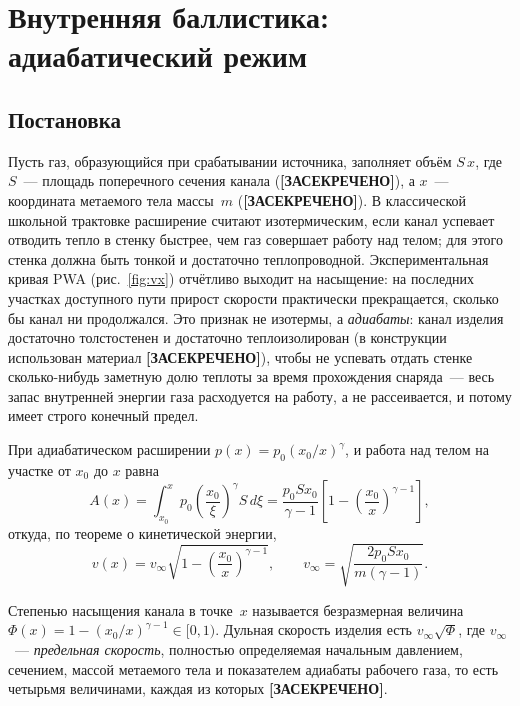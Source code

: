 \documentclass[11pt,a4paper]{article}
\newcommand{\SEC}{\textbf{[ЗАСЕКРЕЧЕНО]}}
\begin{document}
\section{Внутренняя баллистика: адиабатический режим}

\subsection{Постановка}

Пусть газ, образующийся при срабатывании источника, заполняет объём $S\,x$, где $S$~--- площадь поперечного сечения канала (\SEC), а $x$~--- координата метаемого тела массы~$m$ (\SEC). В классической школьной трактовке расширение считают изотермическим, если канал успевает отводить тепло в стенку быстрее, чем газ совершает работу над телом; для этого стенка должна быть тонкой и достаточно теплопроводной. Экспериментальная кривая PWA (рис.~\ref{fig:vx}) отчётливо выходит на насыщение: на последних участках доступного пути прирост скорости практически прекращается, сколько бы канал ни продолжался. Это признак не изотермы, а \emph{адиабаты}: канал изделия достаточно толстостенен и достаточно теплоизолирован (в конструкции использован материал \SEC), чтобы не успевать отдать стенке сколько-нибудь заметную долю теплоты за время прохождения снаряда~--- весь запас внутренней энергии газа расходуется на работу, а не рассеивается, и потому имеет строго конечный предел.

При адиабатическом расширении $p(x)=p_0(x_0/x)^{\gamma}$, и работа над телом на участке от $x_0$ до $x$ равна
\begin{equation}
A(x)=\int_{x_0}^{x} p_0\left(\frac{x_0}{\xi}\right)^{\gamma} S\,d\xi = \frac{p_0 S x_0}{\gamma-1}\left[1-\left(\frac{x_0}{x}\right)^{\gamma-1}\right],
\end{equation}
откуда, по теореме о кинетической энергии,
\begin{equation}\label{eq:main}
\boxed{\;v(x)=v_\infty\sqrt{1-\left(\dfrac{x_0}{x}\right)^{\gamma-1}},\qquad v_\infty=\sqrt{\dfrac{2p_0 S x_0}{m(\gamma-1)}}.\;}
\end{equation}

\begin{definition}
Степенью насыщения канала в точке~$x$ называется безразмерная величина $\Phi(x)=1-(x_0/x)^{\gamma-1}\in[0,1)$. Дульная скорость изделия есть $v_\infty\sqrt{\Phi}$, где $v_\infty$~--- \emph{предельная скорость}, полностью определяемая начальным давлением, сечением, массой метаемого тела и показателем адиабаты рабочего газа, то есть четырьмя величинами, каждая из которых \SEC.
\end{definition}
\end{document}
